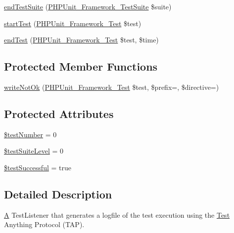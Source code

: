 \begin{DoxyCompactItemize}
\item 
\mbox{\hyperlink{class_p_h_p_unit___util___log___t_a_p_aeec28a4d1328434916ebcdc1ca6b5527}{end\+Test\+Suite}} (\mbox{\hyperlink{class_p_h_p_unit___framework___test_suite}{P\+H\+P\+Unit\+\_\+\+Framework\+\_\+\+Test\+Suite}} \$suite)
\item 
\mbox{\hyperlink{class_p_h_p_unit___util___log___t_a_p_a1a9bddc54f26bb3fb5c2ec9778ea5198}{start\+Test}} (\mbox{\hyperlink{interface_p_h_p_unit___framework___test}{P\+H\+P\+Unit\+\_\+\+Framework\+\_\+\+Test}} \$test)
\item 
\mbox{\hyperlink{class_p_h_p_unit___util___log___t_a_p_a6de65eea8b294795cbc34c4c8cee8546}{end\+Test}} (\mbox{\hyperlink{interface_p_h_p_unit___framework___test}{P\+H\+P\+Unit\+\_\+\+Framework\+\_\+\+Test}} \$test, \$time)
\end{DoxyCompactItemize}
\subsection*{Protected Member Functions}
\begin{DoxyCompactItemize}
\item 
\mbox{\hyperlink{class_p_h_p_unit___util___log___t_a_p_aa9c330b27b62dcccd8734dc349a679ee}{write\+Not\+Ok}} (\mbox{\hyperlink{interface_p_h_p_unit___framework___test}{P\+H\+P\+Unit\+\_\+\+Framework\+\_\+\+Test}} \$test, \$prefix=\textquotesingle{}\textquotesingle{}, \$directive=\textquotesingle{}\textquotesingle{})
\end{DoxyCompactItemize}
\subsection*{Protected Attributes}
\begin{DoxyCompactItemize}
\item 
\mbox{\hyperlink{class_p_h_p_unit___util___log___t_a_p_a0447da5346930e779111805e03813e99}{\$test\+Number}} = 0
\item 
\mbox{\hyperlink{class_p_h_p_unit___util___log___t_a_p_a6c571ecc21b678c7d0a6a8f96ec7d197}{\$test\+Suite\+Level}} = 0
\item 
\mbox{\hyperlink{class_p_h_p_unit___util___log___t_a_p_a13eac668b69db4f84859b810a401f3d3}{\$test\+Successful}} = true
\end{DoxyCompactItemize}


\subsection{Detailed Description}
\mbox{\hyperlink{class_a}{A}} Test\+Listener that generates a logfile of the test execution using the \mbox{\hyperlink{class_test}{Test}} Anything Protocol (T\+AP). 

